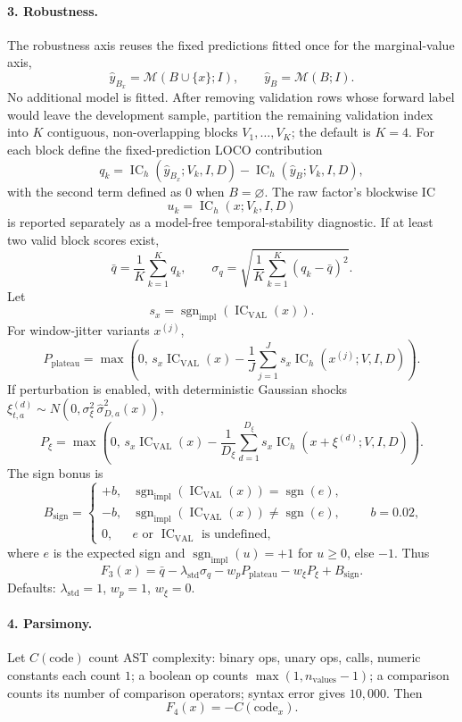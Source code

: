 \documentclass[11pt]{article}
\newcommand{\IC}{\operatorname{IC}}
\newcommand{\sgn}{\operatorname{sgn}}
\begin{document}
\paragraph{3. Robustness.}
The robustness axis reuses the fixed predictions fitted once for the marginal-value
axis,
\[
  \widehat y_{B_x}=\mathcal M(B\cup\{x\};I),
  \qquad
  \widehat y_B=\mathcal M(B;I).
\]
No additional model is fitted.  After removing validation rows whose forward label
would leave the development sample, partition the remaining validation index into
\(K\) contiguous, non-overlapping blocks \(V_1,\ldots,V_K\); the default is
\(K=4\).  For each block define the fixed-prediction LOCO contribution
\[
  q_k
  =
  \IC_h(\widehat y_{B_x};V_k,I,D)
  -
  \IC_h(\widehat y_B;V_k,I,D),
\]
with the second term defined as \(0\) when \(B=\varnothing\).  The raw factor's
blockwise IC
\[
  u_k=\IC_h(x;V_k,I,D)
\]
is reported separately as a model-free temporal-stability diagnostic.  If at least
two valid block scores exist,
\[
  \bar q=\frac{1}{K}\sum_{k=1}^Kq_k,\qquad
  \sigma_q=\sqrt{\frac{1}{K}\sum_{k=1}^K(q_k-\bar q)^2}.
\]
Let
\[
  s_x=\sgn_{\mathrm{impl}}(\IC_{\mathrm{VAL}}(x)).
\]
For window-jitter variants \(x^{(j)}\),
\[
  P_{\mathrm{plateau}}
  =
  \max\left(
    0,\,
    s_x\IC_{\mathrm{VAL}}(x)
    -
    \frac{1}{J}\sum_{j=1}^J s_x\IC_h(x^{(j)};V,I,D)
  \right).
\]
If perturbation is enabled, with deterministic Gaussian shocks
\(\xi^{(d)}_{t,a}\sim N(0,\sigma_{\xi}^2\,\hat\sigma^2_{D,a}(x))\),
\[
  P_{\xi}
  =
  \max\left(
    0,\,
    s_x\IC_{\mathrm{VAL}}(x)
    -
    \frac{1}{D_\xi}\sum_{d=1}^{D_\xi}
      s_x\IC_h(x+\xi^{(d)};V,I,D)
  \right).
\]
The sign bonus is
\[
  B_{\mathrm{sign}}
  =
  \begin{cases}
    +b, & \sgn_{\mathrm{impl}}(\IC_{\mathrm{VAL}}(x))=\sgn(e),\\
    -b, & \sgn_{\mathrm{impl}}(\IC_{\mathrm{VAL}}(x))\neq\sgn(e),\\
    0, & e\text{ or }\IC_{\mathrm{VAL}}\text{ is undefined},
  \end{cases}
  \qquad b=0.02,
\]
where \(e\) is the expected sign and
\(\sgn_{\mathrm{impl}}(u)=+1\) for \(u\ge 0\), else \(-1\).  Thus
\[
  F_3(x)
  =
  \bar q-\lambda_{\mathrm{std}}\sigma_q
  -w_pP_{\mathrm{plateau}}
  -w_\xi P_\xi
  +B_{\mathrm{sign}}.
\]
Defaults: \(\lambda_{\mathrm{std}}=1\), \(w_p=1\), \(w_\xi=0\).

\paragraph{4. Parsimony.}
Let \(C(\text{code})\) count AST complexity:
binary ops, unary ops, calls, numeric constants each count \(1\);
a boolean op counts \(\max(1,n_{\mathrm{values}}-1)\);
a comparison counts its number of comparison operators;
syntax error gives \(10{,}000\).  Then
\[
  F_4(x)=-C(\text{code}_x).
\]
\end{document}
